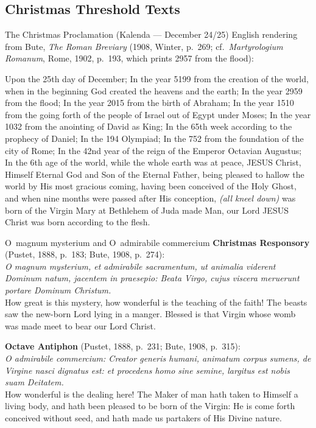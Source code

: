 \subsection{Christmas Threshold Texts}

\begin{massbox}{The Christmas Proclamation (Kalenda --- December 24/25)}
English rendering from Bute, \textit{The Roman Breviary} (1908, Winter, p.~269; cf.~\textit{Martyrologium Romanum}, Rome, 1902, p.~193, which prints 2957 from the flood):

\smallskip
Upon the 25th day of December; In the year 5199 from the creation of the world, when in the beginning God created the heavens and the earth; In the year 2959 from the flood; In the year 2015 from the birth of Abraham; In the year 1510 from the going forth of the people of Israel out of Egypt under Moses; In the year 1032 from the anointing of David as King; In the 65th week according to the prophecy of Daniel; In the 194 Olympiad; In the 752 from the foundation of the city of Rome; In the 42nd year of the reign of the Emperor Octavian Augustus; In the 6th age of the world, while the whole earth was at peace, JESUS Christ, Himself Eternal God and Son of the Eternal Father, being pleased to hallow the world by His most gracious coming, having been conceived of the Holy Ghost, and when nine months were passed after His conception, \textit{(all kneel down)} was born of the Virgin Mary at Bethlehem of Juda made Man, our Lord JESUS Christ was born according to the flesh.
\end{massbox}

\begin{massbox}{O~magnum mysterium and O~admirabile commercium}
\textbf{Christmas Responsory} (Pustet, 1888, p.~183; Bute, 1908, p.~274):\\
\textit{O magnum mysterium, et admirabile sacramentum, ut animalia viderent Dominum natum, jacentem in praesepio: Beata Virgo, cujus viscera meruerunt portare Dominum Christum.}\\
How great is this mystery, how wonderful is the teaching of the faith! The beasts saw the new-born Lord lying in a manger. Blessed is that Virgin whose womb was made meet to bear our Lord Christ.

\medskip
\textbf{Octave Antiphon} (Pustet, 1888, p.~231; Bute, 1908, p.~315):\\
\textit{O admirabile commercium: Creator generis humani, animatum corpus sumens, de Virgine nasci dignatus est: et procedens homo sine semine, largitus est nobis suam Deitatem.}\\
How wonderful is the dealing here! The Maker of man hath taken to Himself a living body, and hath been pleased to be born of the Virgin: He is come forth conceived without seed, and hath made us partakers of His Divine nature.
\end{massbox}
